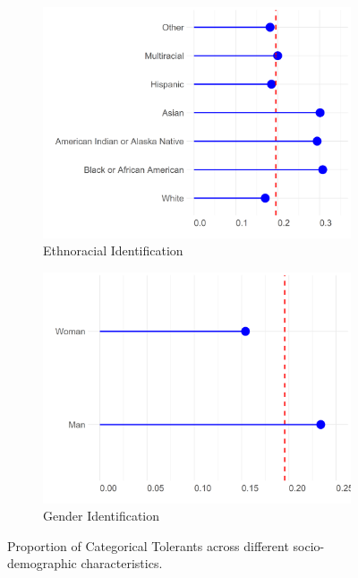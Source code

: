 \documentclass[12pt]{article}
\begin{document}
\begin{figure}[ht!]
\begin{subfigure}[b]{0.3\textwidth}
        \includegraphics[width=1.0\textwidth]{Plots/uni-dist-cat-tol-rac.png}
            \caption{Ethnoracial Identification}
            \label{fig:cat-tol-rac}
    \end{subfigure}
     \begin{subfigure}[b]{0.3\textwidth}
        \includegraphics[width=1.0\textwidth]{Plots/uni-dist-cat-tol-gen.png}
            \caption{Gender Identification}
            \label{fig:cat-tol-gen}
    \end{subfigure}
    \caption{Proportion of Categorical Tolerants across different socio-demographic characteristics.}
    \label{fig:cat-tol}
\end{figure}
\end{document}
